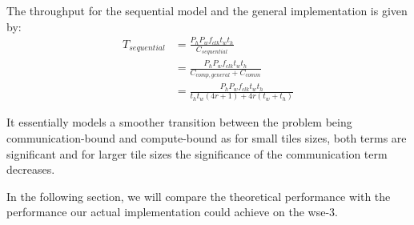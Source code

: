 The throughput for the sequential model and the general implementation is given by:
\begin{equation}
    \label{eq:throughput_sequential}
    \begin{aligned}
        T_{sequential} &= \frac{P_h P_w f_{clk} t_w t_h}{C_{sequential}} \\[0.5ex]
        &= \frac{P_h P_w f_{clk} t_w t_h}{C_{comp,general} + C_{comm}} \\[0.5ex]
        &= \frac{P_h P_w f_{clk} t_w t_h}{t_h t_w \left(4r + 1\right) + 4r\left(t_w+t_h\right)}
    \end{aligned}
\end{equation}

It essentially models a smoother transition between the problem being communication-bound and compute-bound as for small tiles sizes, both terms are significant and for larger tile sizes the significance of the communication term decreases.

In the following section, we will compare the theoretical performance with the performance our actual implementation could achieve on the \ac{wse}-3.